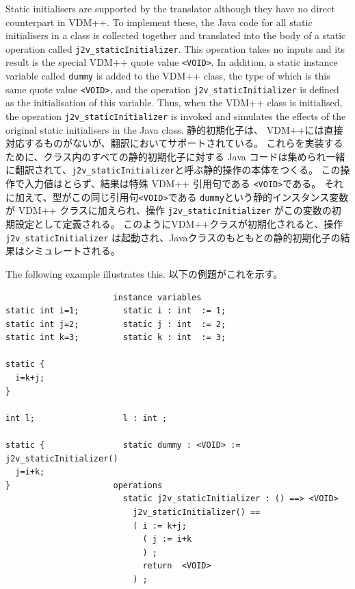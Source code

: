 \documentclass[\pformat,12pt]{jarticle}
\begin{document}
Static initialisers are supported by the translator although they have
no direct counterpart in VDM++. To implement these, the Java code for
all static initialisers in a class is collected together and
translated into the body of a static operation called
\texttt{j2v\_staticInitializer}. This operation takes no inputs and
its result is the special VDM++ quote value \texttt{<VOID>}. In
addition, a static instance variable called \texttt{dummy} is added to
the VDM++ class, the type of which is this same quote value
\texttt{<VOID>}, and the operation \texttt{j2v\_staticInitializer} is
defined as the initialisation of this variable. Thus, when the VDM++
class is initialised, the operation \texttt{j2v\_staticInitializer} is
invoked and simulates the effects of the original static initialisers
in the Java class. 
静的初期化子は、 VDM++には直接対応するものがないが、翻訳においてサポートされている。
これらを実装するために、クラス内のすべての静的初期化子に対する Java コードは集められ一緒に翻訳されて、\texttt{j2v\_staticInitializer}と呼ぶ静的操作の本体をつくる。 
この操作で入力値はとらず、結果は特殊 VDM++ 引用句である \texttt{<VOID>}である。 それに加えて、型がこの同じ引用句\texttt{<VOID>}である \texttt{dummy}という静的インスタンス変数が VDM++ クラスに加えられ、操作 \texttt{j2v\_staticInitializer} がこの変数の初期設定として定義される。
このようにVDM++クラスが初期化されると、操作 \texttt{j2v\_staticInitializer} は起動され、Javaクラスのもともとの静的初期化子の結果はシミュレートされる。

The following example illustrates this.
以下の例題がこれを示す。

\begin{small}
\begin{verbatim}
                      instance variables
static int i=1;         static i : int  := 1;
static int j=2;         static j : int  := 2;
static int k=3;         static k : int  := 3;

static {
  i=k+j;
}

int l;                  l : int ;
                        
static {                static dummy : <VOID> := j2v_staticInitializer()
  j=i+k;              
}                     operations
                        static j2v_staticInitializer : () ==> <VOID>
                          j2v_staticInitializer() ==
                          ( i := k+j;
                            ( j := i+k
                            ) ;
                            return  <VOID>
                          ) ;
\end{verbatim}
\end{small}
\end{document}
